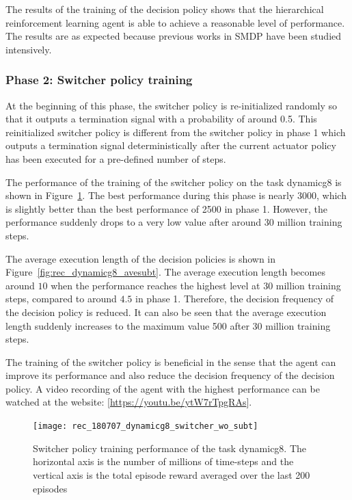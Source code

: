 The results of the training of the decision policy shows that the hierarchical reinforcement learning agent is able to achieve a reasonable level of performance. The results are as expected because previous works in SMDP have been studied intensively.

\subsubsection{Phase 2: Switcher policy training}
At the beginning of this phase, the switcher policy is re-initialized randomly so that it outputs a termination signal with a probability of around 0.5. This reinitialized switcher policy is different from the switcher policy in phase 1 which outputs a termination signal deterministically after the current actuator policy has been executed for a pre-defined number of steps. 

The performance of the training of the switcher policy on the task dynamicg8 is shown in Figure~\ref{fig:rec_dynamicg8_switcher}. The best performance during this phase is nearly 3000, which is slightly better than the best performance of 2500 in phase 1. However, the performance suddenly drops to a very low value after around 30 million training steps.

The average execution length of the decision policies is shown in Figure~\ref{fig:rec_dynamicg8_avesubt}. The average execution length becomes around $10$ when the performance reaches the highest level at 30 million training steps, compared to around $4.5$ in phase 1. Therefore, the decision frequency of the decision policy is reduced. It can also be seen that the average execution length suddenly increases to the maximum value 500 after 30 million training steps.

The training of the switcher policy is beneficial in the sense that the agent can improve its performance and also reduce the decision frequency of the decision policy. A video recording of the agent with the highest performance can be watched at  the website: [\url{https://youtu.be/ytW7rTpgRAs}].

\begin{figure}[!htbp]
	\centering
	\texttt{[image: rec\_180707\_dynamicg8\_switcher\_wo\_subt]}
	\caption{Switcher policy training performance of the task dynamicg8. The horizontal axis is the number of millions of time-steps and the vertical axis is the total episode reward averaged over the last 200 episodes}
	\label{fig:rec_dynamicg8_switcher}
\end{figure}

